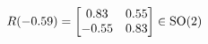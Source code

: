 \documentclass[preview]{standalone}
\begin{document}
\begin{align*}
\special{dvisvgm:raw <g id='unique000'>}R(-0.59) = \begin{bmatrix} 0.83 & 0.55 \\ -0.55 & 0.83 \end{bmatrix} \in \text{SO}(2)\special{dvisvgm:raw </g>}
\end{align*}
\end{document}
